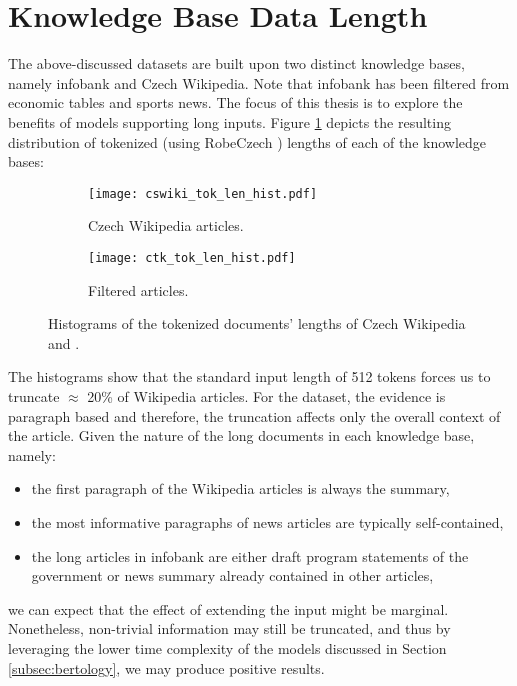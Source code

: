 \section{Knowledge Base Data Length}
\label{sec:data_length}

The above-discussed datasets are built upon two distinct knowledge bases, namely \CTK{} infobank and Czech Wikipedia.
Note that \CTK{} infobank has been filtered from economic tables and sports news.
The focus of this thesis is to explore the benefits of models supporting long inputs. 
Figure \ref{fig:len_hist} depicts the resulting distribution of tokenized (using RobeCzech \citep{robeczech}) lengths of each of the knowledge bases:
\begin{figure}[!htb]
  \centering
  \begin{subfigure}[t]{.49\textwidth}
    \texttt{[image: cswiki\_tok\_len\_hist.pdf]}
    \caption{Czech Wikipedia articles.}
  \end{subfigure}
  \hfill
  \begin{subfigure}[t]{.49\textwidth}
    \texttt{[image: ctk\_tok\_len\_hist.pdf]}
    \caption{Filtered \CTK{} articles.}
  \end{subfigure}
  \caption[Histograms of Tokenized Datasets Lengths]{Histograms of the tokenized documents' lengths of Czech Wikipedia and \CTK{}.}
  \label{fig:len_hist}
\end{figure}

The histograms show that the standard input length of 512 tokens forces us to truncate $\approx$ 20\% of Wikipedia articles. For the \CTK{} dataset, the evidence is paragraph based and therefore, the truncation affects only the overall context of the article.
Given the nature of the long documents in each knowledge base, namely:
\begin{itemize}
  \item the first paragraph of the Wikipedia articles is always the summary,
  \item the most informative paragraphs of \CTK{} news articles are typically self-contained,
  \item the long articles in \CTK{} infobank are either draft program statements of the government or news summary already contained in other articles,
\end{itemize}
we can expect that the effect of extending the input might be marginal.
Nonetheless, non-trivial information may still be truncated, and thus by leveraging the lower time complexity of the models discussed in Section \ref{subsec:bertology}, we may produce positive results.

